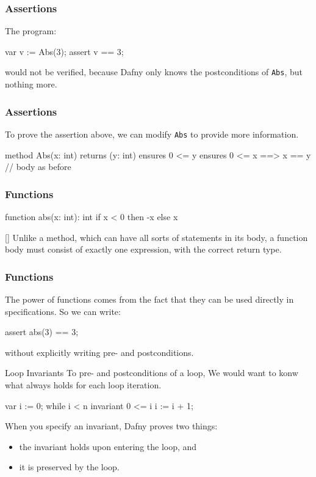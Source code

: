 \documentclass[10pt, compress]{beamer}
\begin{document}
\begin{frame}[fragile]
  \frametitle{Assertions}

  The program:
  \begin{verbnobox}[\footnotesize]
var v := Abs(3);
assert v == 3;
  \end{verbnobox}
  would not be verified, because Dafny only knows the postconditions of \verb|Abs|, but nothing more.
\end{frame}

\begin{frame}[fragile]
  \frametitle{Assertions}
  To prove the assertion above, we can modify \verb|Abs| to provide more information.
  \begin{verbnobox}[\footnotesize]
method Abs(x: int) returns (y: int)
   ensures 0 <= y
   ensures 0 <= x ==> x == y
{
   // body as before
}
  \end{verbnobox}
\end{frame}

\begin{frame}[fragile]
  \frametitle{Functions}
  \begin{verbnobox}[\footnotesize]
function abs(x: int): int
{
   if x < 0 then -x else x
}
  \end{verbnobox}[\footnotesize]
  Unlike a method, which can have all sorts of statements in its body, a function body must consist of exactly one expression, with the correct return type.
\end{frame}

\begin{frame}[fragile]
  \frametitle{Functions}
The power of functions comes from the fact that they can be used directly in specifications. So we can write:
  \begin{verbnobox}[\footnotesize]
assert abs(3) == 3;
  \end{verbnobox}
without explicitly writing pre- and postconditions.

\end{frame}

\begin{frame}[fragile]{Loop Invariants}
To pre- and postconditions of a loop, We would want to konw what always holds for each loop iteration.
  \begin{verbnobox}[\footnotesize]
var i := 0;
while i < n
   invariant 0 <= i
{
   i := i + 1;
}
  \end{verbnobox}
When you specify an invariant, Dafny proves two things:
  \begin{itemize}
  \item the invariant holds upon entering the loop, and
  \item it is preserved by the loop.
  \end{itemize}
\end{frame}
\end{document}
